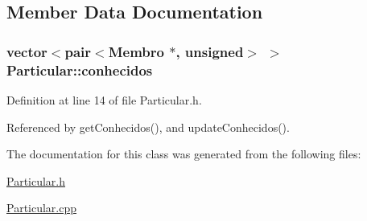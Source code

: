 \subsection{Member Data Documentation}
\hypertarget{class_particular_aa7275585be06abbb131d9acda989847d}{
\subsubsection[{conhecidos}]{\setlength{\rightskip}{0pt plus 5cm}vector$<$pair$<${\bf Membro} $\ast$, unsigned$>$ $>$ Particular\+::conhecidos\hspace{0.3cm}{\ttfamily [private]}}}\label{class_particular_aa7275585be06abbb131d9acda989847d}


Definition at line 14 of file Particular.\+h.



Referenced by get\+Conhecidos(), and update\+Conhecidos().



The documentation for this class was generated from the following files\+:\begin{DoxyCompactItemize}
\item 
\hyperlink{_particular_8h}{Particular.\+h}\item 
\hyperlink{_particular_8cpp}{Particular.\+cpp}\end{DoxyCompactItemize}
